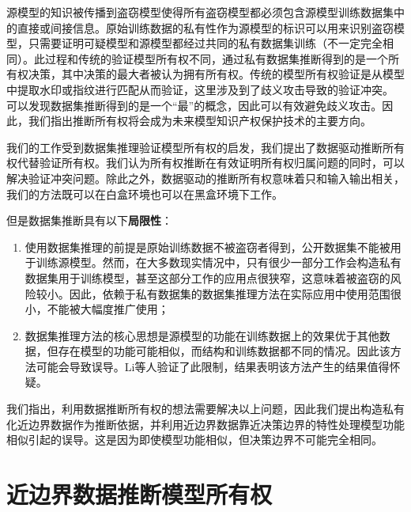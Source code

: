 源模型的知识被传播到盗窃模型使得所有盗窃模型都必须包含源模型训练数据集中的直接或间接信息。原始训练数据的私有性作为源模型的标识可以用来识别盗窃模型，只需要证明可疑模型和源模型都经过共同的私有数据集训练（不一定完全相同）。此过程和传统的验证模型所有权不同，通过私有数据集推断得到的是一个所有权决策，其中决策的最大者被认为拥有所有权。传统的模型所有权验证是从模型中提取水印或指纹进行匹配从而验证，这里涉及到了歧义攻击导致的验证冲突。 可以发现数据集推断得到的是一个“最”的概念，因此可以有效避免歧义攻击。因此，我们指出推断所有权将会成为未来模型知识产权保护技术的主要方向。

我们的工作受到数据集推理验证模型所有权的启发，我们提出了数据驱动推断所有权代替验证所有权。我们认为所有权推断在有效证明所有权归属问题的同时，可以解决验证冲突问题。除此之外，数据驱动的推断所有权意味着只和输入输出相关，我们的方法既可以在白盒环境也可以在黑盒环境下工作。

但是数据集推断具有以下\textbf{局限性}：
\begin{enumerate}
	\renewcommand{\labelenumi}{\theenumi)}
	\item 使用数据集推理的前提是原始训练数据不被盗窃者得到，公开数据集不能被用于训练源模型。然而，在大多数现实情况中，只有很少一部分工作会构造私有数据集用于训练模型，甚至这部分工作的应用点很狭窄，这意味着被盗窃的风险较小。因此，依赖于私有数据集的数据集推理方法在实际应用中使用范围很小，不能被大幅度推广使用；
	\item 数据集推理方法的核心思想是源模型的功能在训练数据上的效果优于其他数据，但存在模型的功能可能相似，而结构和训练数据都不同的情况。因此该方法可能会导致误导。Li\cite{lao2022deepauth}等人验证了此限制，结果表明该方法产生的结果值得怀疑。
\end{enumerate}

我们指出，利用数据推断所有权的想法需要解决以上问题，因此我们提出构造私有化近边界数据作为推断依据，并利用近边界数据靠近决策边界的特性处理模型功能相似引起的误导。这是因为即使模型功能相似，但决策边界不可能完全相同。

\section{近边界数据推断模型所有权}

